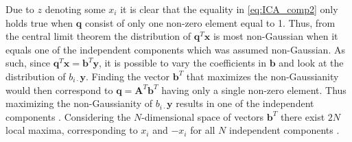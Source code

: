 Due to $z$ denoting some $x_i$ it is clear that the equality in \eqref{eq:ICA_comp2} only holds true when $\mathbf{q}$ consist of only one non-zero element equal to 1.  
Thus, from the central limit theorem the distribution of $\mathbf{q}^T \mathbf{x}$ is most non-Gaussian when it equals one of the independent components which was assumed non-Gaussian. 
As such, since $\mathbf{q}^T \mathbf{x} = \mathbf{b}^{T} \mathbf{y}$, it is possible to vary the coefficients in $\mathbf{b}$ and look at the distribution of $b_{i \cdot} \mathbf{y}$. 
Finding the vector $\mathbf{b}^T$ that maximizes the non-Gaussianity would then correspond to $\mathbf{q} = \mathbf{A}^T \mathbf{b}^T$ having only a single non-zero element. 
Thus maximizing the non-Gaussianity of $b_{i \cdot} \mathbf{y}$ results in one of the independent components \cite[p. 166]{ICA}. 
Considering the $N$-dimensional space of vectors $\mathbf{b}^T$ there exist $2N$ local maxima, corresponding to $x_i$ and $-x_i$ for all $N$ independent components \cite[p. 166]{ICA}. 

